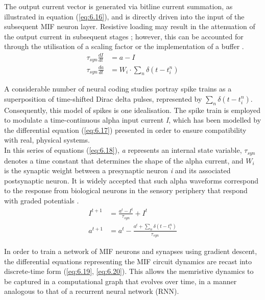 \noindent The output current vector is generated via bitline current summation, as illustrated in equation (\ref{eq:6.16}), and is directly driven into the input of the subsequent MIF neuron layer. Resistive loading may result in the attenuation of the output current in subsequent stages \cite{wang2020high}; however, this can be accounted for through the utilisation of a scaling factor or the implementation of a buffer \cite{wang2022low}.
\begin{align}
\tau_{syn} \frac{dI}{dt} &= a - I \label{eq:6.17} \\
\tau_{syn}\frac{da}{dt} &= W_i \cdot\sum_{n}\delta\left( t - t_i^n \right) \label{eq:6.18}
\end{align}

\noindent A considerable number of neural coding studies portray spike trains as a superposition of time-shifted Dirac delta pulses, represented by $\sum_{n}\delta\left( t - t_i^n \right)$. Consequently, this model of spikes is one idealisation. The spike train is employed to modulate a time-continuous alpha input current \textit{I}, which has been modelled by the differential equation (\ref{eq:6.17}) presented in order to ensure compatibility with real, physical systems. \\

\noindent In this series of equations (\ref{eq:6.18}), \textit{a} represents an internal state variable, $\tau_{syn}$ denotes a time constant that determines the shape of the alpha current, and $W_i$ is the synaptic weight between a presynaptic neuron \textit{i} and its associated postsynaptic neuron. It is widely accepted that such alpha waveforms correspond to the response from biological neurons in the sensory periphery that respond with graded potentials \cite{eshraghian2018formulation}.
\begin{align}
I^{t+1} &= \frac{a^t - I^t}{\tau_{syn}} + I^t \label{eq:6.19} \\
a^{t+1} &= a^t - \frac{a^t + \sum_{n}\delta\left( t - t_i^n \right)}{\tau_{syn}} \label{eq:6.20}
\end{align}


\noindent In order to train a network of MIF neurons and synapses using gradient descent, the differential equations representing the MIF circuit dynamics are recast into discrete-time form (\ref{eq:6.19}, \ref{eq:6.20}). This allows the memristive dynamics to be captured in a computational graph that evolves over time, in a manner analogous to that of a recurrent neural network (RNN).\\

